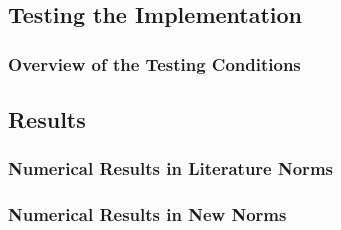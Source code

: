 \subsection{Testing the Implementation}

\begin{frame}
    \frametitle{Overview of the Testing Conditions}

    
\end{frame}

\subsection{Results}

\begin{frame}
    \frametitle{Numerical Results in Literature Norms}

    
\end{frame}

\begin{frame}
    \frametitle{Numerical Results in New Norms}

    
\end{frame}